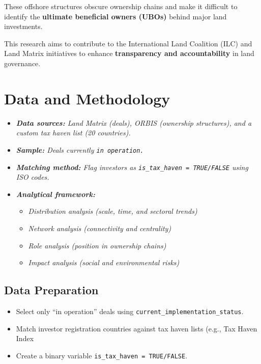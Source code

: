 \documentclass[
  letterpaper,
  DIV=11,
  numbers=noendperiod]{scrreprt}
\providecommand{\tightlist}{%
  \setlength{\itemsep}{0pt}\setlength{\parskip}{0pt}}
\begin{document}
These offshore structures obscure ownership chains and make it difficult
to identify the \textbf{ultimate beneficial owners (UBOs)} behind major
land investments.

This research aims to contribute to the International Land Coalition
(ILC) and Land Matrix initiatives to enhance \textbf{transparency and
accountability} in land governance.


\chapter{Data and Methodology}\label{data-and-methodology}

\begin{itemize}
\tightlist
\item
  \emph{\textbf{Data sources:} Land Matrix (deals), ORBIS (ownership
  structures), and a custom tax haven list (20 countries).}
\item
  \emph{\textbf{Sample:} Deals currently \texttt{in\ operation.}}
\item
  \emph{\textbf{Matching method:} Flag investors as
  \texttt{is\_tax\_haven\ =\ TRUE/FALSE} using ISO codes.}
\item
  \textbf{\emph{Analytical framework:}}

  \begin{itemize}
  \tightlist
  \item
    \emph{Distribution analysis (scale, time, and sectoral trends)}
  \item
    \emph{Network analysis (connectivity and centrality)}
  \item
    \emph{Role analysis (position in ownership chains)}
  \item
    \emph{Impact analysis (social and environmental risks)}
  \end{itemize}
\end{itemize}

\section{Data Preparation}\label{data-preparation}

\begin{itemize}
\tightlist
\item
  Select only ``in operation'' deals using
  \texttt{current\_implementation\_status}.
\end{itemize}

\begin{itemize}
\tightlist
\item
  Match investor registration countries against tax haven lists (e.g.,
  Tax Haven Index
\item
  Create a binary variable \texttt{is\_tax\_haven\ =\ TRUE/FALSE}.
\end{itemize}
\end{document}
